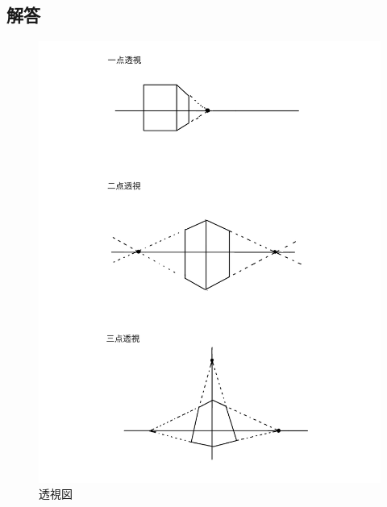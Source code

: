 \documentclass[]{jarticle}          %
\begin{document}
\subsection{解答}
\begin{figure}[!ht]
  \begin{center}
    \includegraphics[]{figures/1.pdf}
    \caption{透視図}
  \end{center}
\end{figure}
\end{document}
